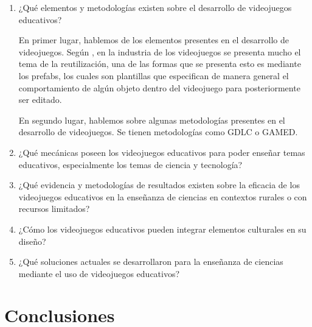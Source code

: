 \begin{enumerate}
    \item ¿Qué elementos y metodologías existen sobre el desarrollo de videojuegos educativos?

    En primer lugar, hablemos de los elementos presentes en el desarrollo de videojuegos. Según \cite{}, en la industria de los videojuegos se presenta mucho el tema de la reutilización, una de las formas que se presenta esto es mediante los prefabs, los cuales son plantillas que especifican de manera general el comportamiento de algún objeto dentro del videojuego para posteriormente ser editado.

    En segundo lugar, hablemos sobre algunas metodologías presentes en el desarrollo de videojuegos. Se tienen metodologías como GDLC o GAMED.
    
    \item ¿Qué mecánicas poseen los videojuegos educativos para poder enseñar temas educativos, especialmente los temas de ciencia y tecnología?
    \item ¿Qué evidencia y metodologías de resultados existen sobre la eficacia de los videojuegos educativos en la enseñanza de ciencias en contextos rurales o con recursos limitados?
    \item ¿Cómo los videojuegos educativos pueden integrar elementos culturales en su diseño?
    \item ¿Qué soluciones actuales se desarrollaron para la enseñanza de ciencias mediante el uso de videojuegos educativos?
\end{enumerate}

\section{Conclusiones}